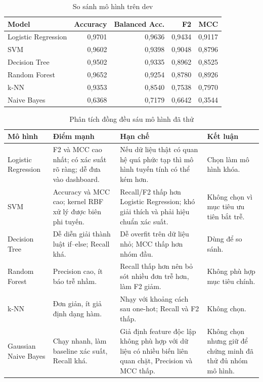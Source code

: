 \documentclass[12pt,a4paper,oneside]{report}
\renewcommand{\arraystretch}{1.18}
\begin{document}
\begin{table}[H]
\centering
\caption{So sánh mô hình trên dev}
\begin{tabular}{lrrrr}
\toprule
Model & Accuracy & Balanced Acc. & F2 & MCC\\
\midrule
Logistic Regression & 0,9701 & 0,9636 & 0,9434 & 0,9117\\
SVM & 0,9602 & 0,9398 & 0,9048 & 0,8796\\
Decision Tree & 0,9502 & 0,9335 & 0,8962 & 0,8525\\
Random Forest & 0,9652 & 0,9254 & 0,8780 & 0,8926\\
k-NN & 0,9353 & 0,8540 & 0,7538 & 0,7970\\
Naive Bayes & 0,6368 & 0,7179 & 0,6642 & 0,3544\\
\bottomrule
\end{tabular}
\end{table}

\begin{table}[H]
\centering\scriptsize
\renewcommand{\arraystretch}{1.18}
\caption{Phân tích đồng đều sáu mô hình đã thử}
\begin{tabularx}{\textwidth}{p{2.7cm}X X p{2.4cm}}
\toprule
Mô hình & Điểm mạnh & Hạn chế & Kết luận\\
\midrule
Logistic Regression & F2 và MCC cao nhất; có xác suất rõ ràng; dễ đưa vào
dashboard. & Nếu dữ liệu thật có quan hệ quá phức tạp thì mô hình tuyến tính có
thể kém hơn. & Chọn làm mô hình khóa.\\
SVM & Accuracy và MCC cao; kernel RBF xử lý được biên phi tuyến. & Recall/F2
thấp hơn Logistic Regression; khó giải thích và phải hiệu chuẩn xác suất. &
Không chọn vì mục tiêu ưu tiên bắt trễ.\\
Decision Tree & Dễ diễn giải thành luật if--else; Recall khá. & Dễ
overfit trên dữ liệu nhỏ; MCC thấp hơn nhóm đầu. & Dùng để so sánh.\\
Random Forest & Precision cao, ít báo trễ nhầm. & Recall thấp hơn nên bỏ sót
nhiều đơn trễ hơn, làm F2 giảm. & Không phù hợp mục tiêu chính.\\
k-NN & Đơn giản, ít giả định dạng hàm. & Nhạy với khoảng cách sau one-hot;
Recall và F2 thấp. & Không chọn.\\
Gaussian Naive Bayes & Chạy nhanh, làm baseline xác suất, Recall khá. & Giả
định feature độc lập không phù hợp với dữ liệu có nhiều biến liên quan chặt,
Precision và MCC thấp. & Không chọn nhưng giữ để chứng minh đã thử đủ nhóm mô
hình.\\
\bottomrule
\end{tabularx}
\end{table}
\end{document}

